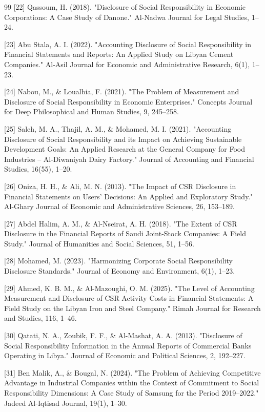 \documentclass[10pt]{NSP1}
\begin{document}
\begin{thebibliography}{99}
[22] Qassoum, H. (2018). "Disclosure of Social Responsibility in Economic Corporations: A Case Study of Danone." Al-Nadwa Journal for Legal Studies, 1–24.

[23] Abu Stala, A. I. (2022). "Accounting Disclosure of Social Responsibility in Financial Statements and Reports: An Applied Study on Libyan Cement Companies." Al-Asil Journal for Economic and Administrative Research, 6(1), 1–23.

[24] Nabou, M., \& Loualbia, F. (2021). "The Problem of Measurement and Disclosure of Social Responsibility in Economic Enterprises." Concepts Journal for Deep Philosophical and Human Studies, 9, 245–258.

[25] Saleh, M. A., Thajil, A. M., \& Mohamed, M. I. (2021). "Accounting Disclosure of Social Responsibility and its Impact on Achieving Sustainable Development Goals: An Applied Research at the General Company for Food Industries – Al-Diwaniyah Dairy Factory." Journal of Accounting and Financial Studies, 16(55), 1–20.

[26] Oniza, H. H., \& Ali, M. N. (2013). "The Impact of CSR Disclosure in Financial Statements on Users' Decisions: An Applied and Exploratory Study." Al-Ghary Journal of Economic and Administrative Sciences, 26, 153–189.

[27] Abdel Halim, A. M., \& Al-Nseirat, A. H. (2018). "The Extent of CSR Disclosure in the Financial Reports of Saudi Joint-Stock Companies: A Field Study." Journal of Humanities and Social Sciences, 51, 1–56.

[28] Mohamed, M. (2023). "Harmonizing Corporate Social Responsibility Disclosure Standards." Journal of Economy and Environment, 6(1), 1–23.

[29] Ahmed, K. B. M., \& Al-Mazoughi, O. M. (2025). "The Level of Accounting Measurement and Disclosure of CSR Activity Costs in Financial Statements: A Field Study on the Libyan Iron and Steel Company." Rimah Journal for Research and Studies, 116, 1–46.

[30] Qatati, N. A., Zoubik, F. F., \& Al-Mashat, A. A. (2013). "Disclosure of Social Responsibility Information in the Annual Reports of Commercial Banks Operating in Libya." Journal of Economic and Political Sciences, 2, 192–227.

[31] Ben Malik, A., \& Bougal, N. (2024). "The Problem of Achieving Competitive Advantage in Industrial Companies within the Context of Commitment to Social Responsibility Dimensions: A Case Study of Samsung for the Period 2019–2022." Jadeed Al-Iqtisad Journal, 19(1), 1–30.


\end{thebibliography}
\end{document}
